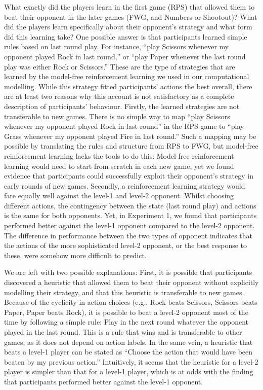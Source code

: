 \documentclass[smallextended]{svjour3}       %
\begin{document}
What exactly did the players learn in the first game (RPS) that allowed
them to beat their opponent in the later games (FWG, and Numbers or
Shootout)? What did the players learn specifically about their
opponent's strategy and what form did this learning take? One possible
answer is that participants learned simple rules based on last round
play. For instance, ``play Scissors whenever my opponent played Rock in
last round,'' or ``play Paper whenever the last round play was either
Rock or Scissors.'' These are the type of strategies that are learned by
the model-free reinforcement learning we used in our computational
modelling. While this strategy fitted participants' actions the best
overall, there are at least two reasons why this account is not
satisfactory as a complete description of participants' behaviour.
Firstly, the learned strategies are not transferable to new games. There
is no simple way to map ``play Scissors whenever my opponent played Rock
in last round'' in the RPS game to ``play Grass whenever my opponent
played Fire in last round.'' Such a mapping may be possible by
translating the rules and structure from RPS to FWG, but model-free
reinforcement learning lacks the tools to do this: Model-free
reinforcement learning would need to start from scratch in each new
game, yet we found evidence that participants could successfully exploit
their opponent's strategy in early rounds of new games. Secondly, a
reinforcement learning strategy would fare equally well against the
level-1 and level-2 opponent. Whilst choosing different actions, the
contingency between the state (last round play) and actions is the same
for both opponents. Yet, in Experiment 1, we found that participants
performed better against the level-1 opponent compared to the level-2
opponent. The difference in performance between the two types of
opponent indicates that the actions of the more sophisticated level-2
opponent, or the best response to these, were somehow more difficult to
predict.

We are left with two possible explanations: First, it is possible that
participants discovered a heuristic that allowed them to beat their
opponent without explicitly modelling their strategy, and that this
heuristic is transferable to new games. Because of the cyclicity in
action choices (e.g., Rock beats Scissors, Scissors beats Paper, Paper
beats Rock), it is possible to beat a level-2 opponent most of the time
by following a simple rule: Play in the next round whatever the opponent
played in the last round. This is a rule that wins and is transferable
to other games, as it does not depend on action labels. In the same
vein, a heuristic that beats a level-1 player can be stated as ``Choose
the action that would have been beaten by my previous action.''
Intuitively, it seems that the heuristic for a level-2 player is simpler
than that for a level-1 player, which is at odds with the finding that
participants performed better against the level-1 opponent.
\end{document}

